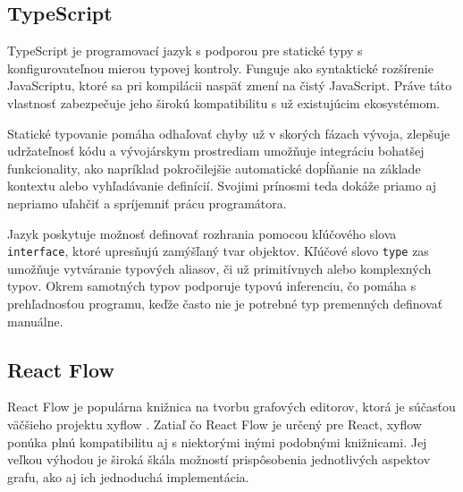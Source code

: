 


\subsection{TypeScript}
TypeScript \cite{typescript} je programovací jazyk s podporou pre statické typy s konfigurovateľnou mierou typovej kontroly. Funguje ako syntaktické rozšírenie JavaScriptu, ktoré sa pri kompilácii naspäť zmení na čistý JavaScript. Práve táto vlastnosť zabezpečuje jeho širokú kompatibilitu s už existujúcim ekosystémom.

Statické typovanie pomáha odhaľovať chyby už v skorých fázach vývoja, zlepšuje udržateľnosť kódu a vývojárskym prostrediam umožňuje integráciu bohatšej funkcionality, ako napríklad pokročilejšie automatické dopĺňanie na základe kontextu alebo vyhľadávanie definícií. Svojimi prínosmi teda dokáže priamo aj nepriamo uľahčiť a spríjemniť prácu programátora.

Jazyk poskytuje možnosť definovať rozhrania pomocou kľúčového slova \verb|interface|, ktoré upresňujú zamýšľaný tvar objektov. Kľúčové slovo \verb|type| zas umožňuje vytváranie typových aliasov, či už primitívnych alebo komplexných typov. Okrem samotných typov podporuje typovú inferenciu, čo pomáha s prehľadnosťou programu, keďže často nie je potrebné typ premenných definovať manuálne.

\subsection{React Flow}
React Flow \cite{reactflow} je populárna knižnica na tvorbu grafových editorov, ktorá je súčasťou väčšieho projektu xyflow \cite{xyflow}. Zatiaľ čo React Flow je určený pre React, xyflow ponúka plnú kompatibilitu aj s niektorými inými podobnými knižnicami. Jej veľkou výhodou je široká škála možností prispôsobenia jednotlivých aspektov grafu, ako aj ich jednoduchá implementácia.

